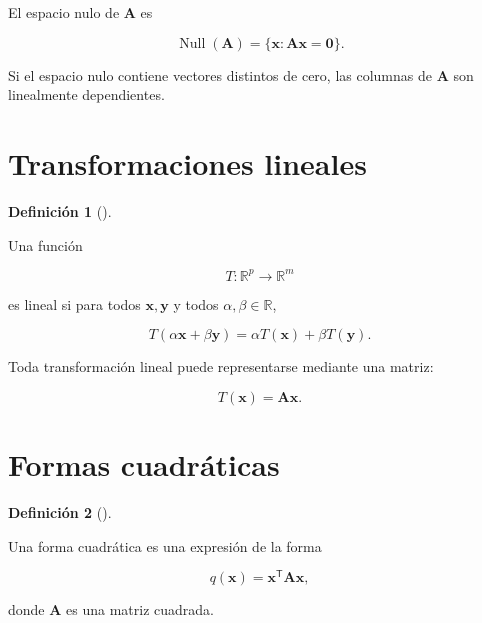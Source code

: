 \documentclass[
  spanish,
  10.5pt,
  letterpaper,
  DIV=11,
  numbers=noendperiod,
  oneside,
  open=any]{scrreprt}
\theoremstyle{definition}
\newtheorem{definition}{Definición}[chapter]
\theoremstyle{definition}
\theoremstyle{plain}
\theoremstyle{remark}
\begin{document}

El espacio nulo de \(\mathbf{A}\) es

\[
\operatorname{Null}(\mathbf{A})
=
\{
\mathbf{x}:
\mathbf{A}\mathbf{x}
=
\mathbf{0}
\}.
\]

Si el espacio nulo contiene vectores distintos de cero, las columnas de
\(\mathbf{A}\) son linealmente dependientes.

\section*{Transformaciones lineales}\label{transformaciones-lineales}


\begin{definition}[]\protect\hypertarget{def-transformacion-lineal}{}\label{def-transformacion-lineal}

Una función

\[
T:\mathbb{R}^{p}\to\mathbb{R}^{m}
\]

es lineal si para todos \(\mathbf{x},\mathbf{y}\) y todos
\(\alpha,\beta\in\mathbb{R}\),

\[
T(\alpha\mathbf{x}+\beta\mathbf{y})
=
\alpha T(\mathbf{x})
+
\beta T(\mathbf{y}).
\]

\end{definition}

Toda transformación lineal puede representarse mediante una matriz:

\[
T(\mathbf{x})
=
\mathbf{A}\mathbf{x}.
\]

\section*{Formas cuadráticas}\label{formas-cuadruxe1ticas}


\begin{definition}[]\protect\hypertarget{def-forma-cuadratica}{}\label{def-forma-cuadratica}

Una forma cuadrática es una expresión de la forma

\[
q(\mathbf{x})
=
\mathbf{x}^{\mathsf T}
\mathbf{A}
\mathbf{x},
\]

donde \(\mathbf{A}\) es una matriz cuadrada.

\end{definition}
\end{document}
